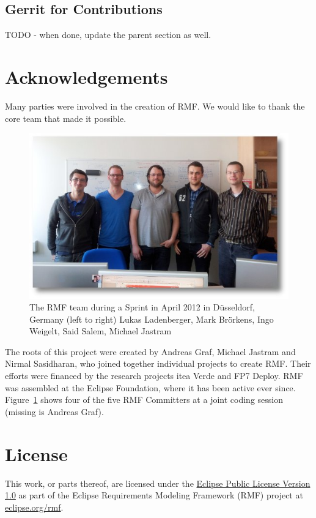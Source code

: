 \subsection{Gerrit for Contributions}

TODO - when done, update the parent section as well.

\section{Acknowledgements}

Many parties were involved in the creation of RMF.  We would like to thank the core team that made it possible.

\begin{figure}[H]
  \centering
  \includegraphics[width=\textwidth]{../rmf-images/2012_03_sprint_team.jpg}
  \caption{The RMF team during a Sprint in April 2012 in Düsseldorf, Germany (left to right) Lukas Ladenberger, Mark Brörkens, Ingo Weigelt, Said Salem, Michael Jastram}
  \label{fig:intro_core_team}
\end{figure}


The roots of this project were created by Andreas Graf, Michael Jastram and Nirmal Sasidharan, who joined together individual projects to create RMF.  Their efforts were financed by the research projects itea Verde and FP7 Deploy.  RMF was assembled at the Eclipse Foundation, where it has been active ever since.  Figure~\ref{fig:intro_core_team} shows four of the five RMF Committers at a joint coding session (missing is Andreas Graf).

\section{License}
\label{sec:license}

This work, or parts thereof, are licensed under the \href{https://www.eclipse.org/legal/epl-v10.html}{Eclipse Public License Version 1.0} as part of the Eclipse Requirements Modeling Framework (RMF) project at \href{https://www.eclipse.org/rmf}{eclipse.org/rmf}.


